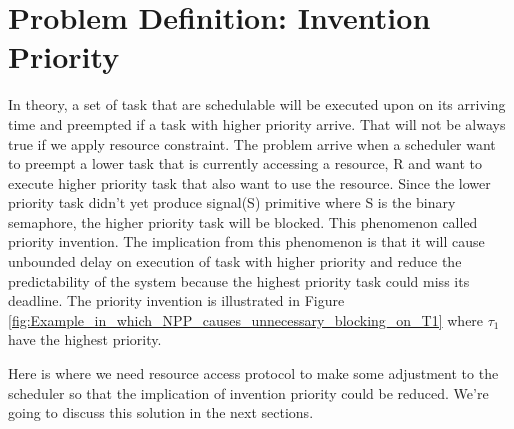 \section{Problem Definition: Invention Priority}

In theory, a set of task that are schedulable will be executed upon on its arriving time and preempted if a task with higher priority arrive. That will not be always true if we apply resource constraint. The problem arrive when a scheduler want to preempt a lower task that is currently accessing a  resource, R and want to execute higher priority task that also want to use the resource. Since the lower priority task didn't yet produce signal(S) primitive where S is the binary semaphore, the higher priority task will be blocked. This phenomenon called priority invention. The implication from this phenomenon is that it will cause unbounded delay on execution of task with higher priority and reduce the predictability of the system because the highest priority task could miss its deadline. The priority invention is illustrated in Figure \ref{fig:Example_in_which_NPP_causes_unnecessary_blocking_on_T1} where $ \tau_{1} $ have the highest priority.

Here is where we need resource access protocol to make some adjustment to the scheduler so that the implication of invention priority could be reduced. We're going to discuss this solution in the next sections.